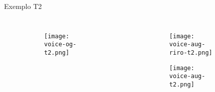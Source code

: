 \begin{frame}{Exemplo T2}
    \begin{columns}
        \begin{figure}
            \begin{subfigure}{\textwidth}
                \centering
                \texttt{[image: voice-og-t2.png]}
            \end{subfigure}
        \end{figure}

        \begin{figure}
            \begin{subfigure}{\textwidth}
                \centering
                \texttt{[image: voice-aug-riro-t2.png]}
            \end{subfigure}
            \begin{subfigure}{\textwidth}
                \centering
                \texttt{[image: voice-aug-t2.png]}
            \end{subfigure}
        \end{figure}
    \end{columns}
\end{frame}


